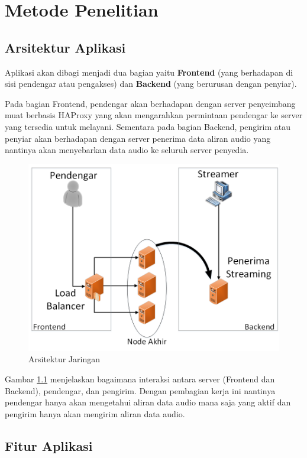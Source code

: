 \chapter{Metode Penelitian}

\section{Arsitektur Aplikasi}

Aplikasi akan dibagi menjadi dua bagian yaitu \textbf{Frontend} (yang berhadapan di sisi pendengar atau pengakses) dan \textbf{Backend} (yang berurusan dengan penyiar). 

Pada bagian Frontend, pendengar akan berhadapan dengan server penyeimbang muat berbasis HAProxy yang akan mengarahkan permintaan pendengar ke server yang tersedia untuk melayani. Sementara pada bagian Backend, pengirim atau penyiar akan berhadapan dengan server penerima data aliran audio yang nantinya akan menyebarkan data audio ke seluruh server penyedia.

\begin{figure}
    \centering
    \includegraphics[width=1\linewidth]{arsitektur}
    \caption{Arsitektur Jaringan}
    \label{fig:arsitektur}
\end{figure}

Gambar \ref{fig:arsitektur}  menjelaskan bagaimana interaksi antara server (Frontend dan Backend), pendengar, dan pengirim. Dengan pembagian kerja ini nantinya pendengar hanya akan mengetahui aliran data audio mana saja yang aktif dan pengirim hanya akan mengirim aliran data audio.

\section{Fitur Aplikasi}

